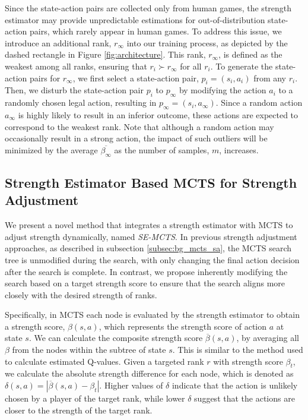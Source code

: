 Since the state-action pairs are collected only from human games, the strength estimator may provide unpredictable estimations for out-of-distribution state-action pairs, which rarely appear in human games.
To address this issue, we introduce an additional rank, $r_\infty$ into our training process, as depicted by the dashed rectangle in Figure \ref{fig:architecture}.
This rank, $r_\infty$, is defined as the weakest among all ranks, ensuring that $r_i\succ r_\infty$ for all $r_i$.
To generate the state-action pairs for $r_\infty$, we first select a state-action pair, $p_i=(s_i,a_i)$ from any $r_i$.
Then, we disturb the state-action pair $p_i$ to $p_\infty$ by modifying the action $a_i$ to a randomly chosen legal action, resulting in $p_\infty=(s_i,a_\infty)$.
Since a random action $a_\infty$ is highly likely to result in an inferior outcome, these actions are expected to correspond to the weakest rank.
Note that although a random action may occasionally result in a strong action, the impact of such outliers will be minimized by the average $\overline{\beta_\infty}$ as the number of samples, $m$, increases.


\subsection{Strength Estimator Based MCTS for Strength Adjustment}
\label{subsec:method_se_mcts}
We present a novel method that integrates a strength estimator with MCTS to adjust strength dynamically, named \textit{SE-MCTS}.
In previous strength adjustment approaches, as described in subsection \ref{subsec:bg_mcts_sa}, the MCTS search tree is unmodified during the search, with only changing the final action decision after the search is complete.
In contrast, we propose inherently modifying the search based on a target strength score to ensure that the search aligns more closely with the desired strength of ranks.

Specifically, in MCTS each node is evaluated by the strength estimator to obtain a strength score, $\beta(s,a)$, which represents the strength score of action $a$ at state $s$.
We can calculate the composite strength score $\overline{\beta}(s,a)$, by averaging all $\beta$ from the nodes within the subtree of state $s$.
This is similar to the method used to calculate estimated Q-values.
Given a targeted rank $r$ with strength score $\beta_t$, we calculate the absolute strength difference for each node, which is denoted as $\delta(s,a)=|\overline{\beta}(s,a)-\beta_t|$.
Higher values of $\delta$ indicate that the action is unlikely chosen by a player of the target rank, while lower $\delta$ suggest that the actions are closer to the strength of the target rank.

